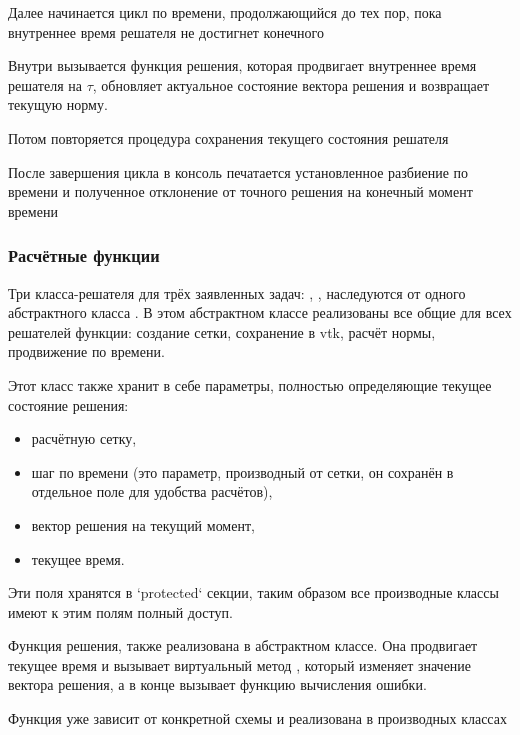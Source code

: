 Далее начинается цикл по времени,
продолжающийся до тех пор, пока внутреннее время решателя
не достигнет конечного

Внутри вызывается функция решения, которая продвигает
внутреннее время решателя на $\tau$, обновляет
актуальное состояние вектора решения
и возвращает текущую норму.

Потом повторяется процедура сохранения
текущего состояния решателя

После завершения цикла в консоль печатается
установленное разбиение по времени и
полученное отклонение от точного решения
на конечный момент времени 

\subsubsection{Расчётные функции}

Три класса-решателя для трёх заявленных задач:
,
,
наследуются от одного абстрактного класса
. В этом
абстрактном классе реализованы
все общие для всех решателей функции:
создание сетки, сохранение в vtk,
расчёт нормы, продвижение по времени.

Этот класс также хранит в себе параметры, полностью определяющие текущее состояние решения:
\begin{itemize}
\item расчётную сетку,
\item шаг по времени (это параметр, производный от сетки, он сохранён в отдельное поле для удобства расчётов),
\item вектор решения на текущий момент,
\item текущее время.
\end{itemize}

Эти поля хранятся в `protected` секции, таким образом
все производные классы имеют к этим полям полный доступ.

Функция решения, также реализована в абстрактном классе.
Она продвигает текущее время и вызывает
виртуальный метод , который
изменяет значение вектора решения, а в конце вызывает
функцию вычисления ошибки.

Функция  уже зависит от конкретной схемы и реализована в
производных классах

